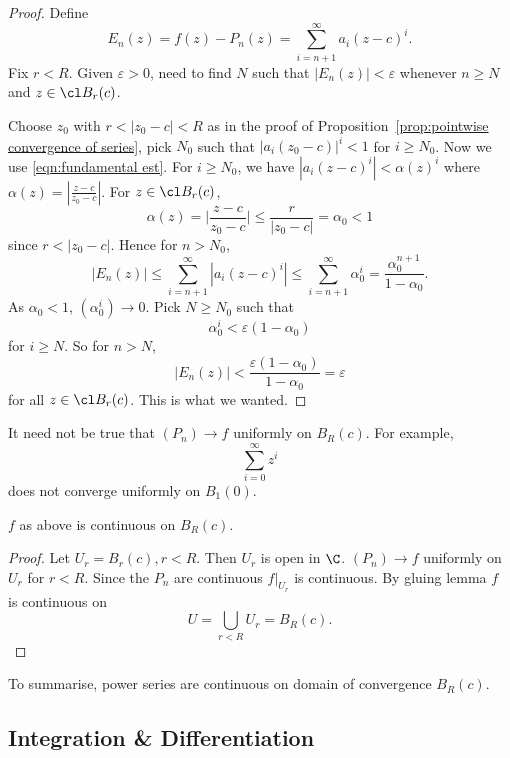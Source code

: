 \documentclass[a4paper]{article}
\theoremstyle{definition}
\begin{document}
\begin{proof}
  Define
  \[
    E_n(z) = f(z) - P_n(z) = \sum_{i=n+1}^{\infty}a_i(z-c)^i. 
  \]
  Fix \(r< R\). Given \(\varepsilon>0\), need to find \(N \) such that \(|E_n(z)| < \varepsilon\) whenever \(n\geq N\) and \(z\in \cl B_r(c)\).

  Choose \(z_0\) with \(r< |z_0-c| < R\) as in the proof of Proposition~\ref{prop:pointwise convergence of series}, pick \(N_0\) such that \(|a_i(z_0-c)|^i<1\) for \(i\geq N_0\). Now we use \ref{eqn:fundamental est}. For \(i\geq N_0\), we have \(|a_i(z-c)^i| < \alpha(z)^i\) where \(\alpha(z) = |\frac{z-c}{z_0-c}|\). For \(z\in \cl B_r(c)\),
  \[
    \alpha(z) = \Big| \frac{z-c}{z_0-c} \Big| \leq \frac{r}{|z_0-c|} = \alpha_0 < 1
  \]
  since \(r < |z_0-c|\). Hence for \(n>N_0\),
  \[
    |E_n(z)| \leq \sum_{i=n+1}^{\infty}|a_i(z-c)^i| \leq \sum_{i=n+1}^{\infty}\alpha_0^i = \frac{\alpha_0^{n+1}}{1-\alpha_0}.
  \]
  As \(\alpha_0 < 1\), \((\alpha_0^i)\to 0\). Pick \(N\geq N_0\) such that
  \[
\alpha_0^i < \varepsilon (1-\alpha_0)
  \]
  for \(i\geq N\). So for \(n>N\),
  \[
    |E_n(z)| < \frac{\varepsilon (1-\alpha_0)}{1-\alpha_0} = \varepsilon
  \]
  for all \(z\in \cl B_r(c)\).
  This is what we wanted.
\end{proof}

\begin{note}
  It need not be true that \((P_n)\to f\) uniformly on \(B_R(c)\). For example,
  \[
    \sum_{i=0}^{\infty}z^i
  \]
  does not converge uniformly on \(B_1(0)\).
\end{note}

\begin{cor}
  \(f\) as above is continuous on \(B_R(c)\).
\end{cor}

\begin{proof}
  Let \(U_r = B_r(c), r<R\). Then \(U_r\) is open in \(\C\). \((P_n)\to f\) uniformly on \(U_r\) for \(r< R\). Since the \(P_n\) are continuous \(f|_{U_r}\) is continuous. By gluing lemma \(f\) is continuous on
  \[
    U = \bigcup_{r<R} U_r = B_R(c).
  \]
\end{proof}

To summarise, power series are continuous on domain of convergence \(B_R(c)\).

\subsection{Integration \& Differentiation}
\end{document}
